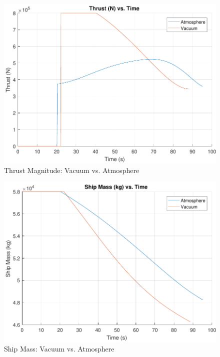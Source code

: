 \begin{figure}[H]
	\centering
	\begin{minipage}{4.5 in}
		\includegraphics[width=\linewidth]{Figures/thratmovsvac.pdf}
		\caption{Thrust Magnitude: Vacuum vs. Atmosphere \label{fig:thratmovsvac} }
	\end{minipage}
\end{figure}

\begin{figure}[H]
	\centering
	\begin{minipage}{4.5 in}
		\includegraphics[width=\linewidth]{Figures/massatmovsvac.pdf}
		\caption{Ship Mass: Vacuum vs. Atmosphere \label{fig:massatmovsvac} }
	\end{minipage}
\end{figure}



